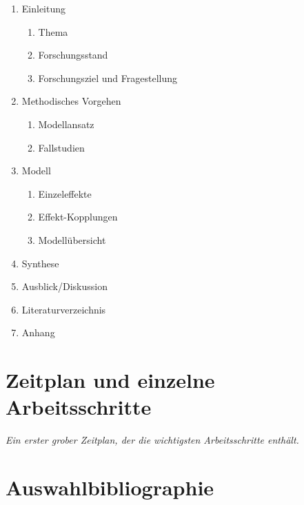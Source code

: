 \documentclass[11pt, titlepage=true]{scrartcl} %
\newcommand{\was}[1]{\small\textit{#1}}
\begin{document}
\begin{enumerate}
\item Einleitung
	\begin{enumerate}
		\item Thema
		\item Forschungsstand
		\item Forschungsziel und Fragestellung
	\end{enumerate}
\item Methodisches Vorgehen
	\begin{enumerate}
		\item Modellansatz
		\item Fallstudien
	\end{enumerate}
\item Modell
	\begin{enumerate}
		\item Einzeleffekte
		\item Effekt-Kopplungen
		\item Modellübersicht
	\end{enumerate}

\item Synthese
\item Ausblick/Diskussion
\item Literaturverzeichnis
\item Anhang
\end{enumerate}

\section{Zeitplan und einzelne Arbeitsschritte}
\was{Ein erster grober Zeitplan, der die wichtigsten Arbeitsschritte enthält.}

\section{Auswahlbibliographie}
\cite{tukker_eight_2004}
\printbibliography
\end{document}
